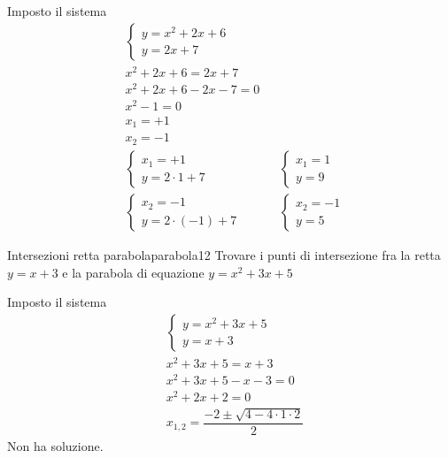 Imposto il sistema
\begin{align*}
&\begin{cases}
y=x^2+2x+6\\
y=2x+7
\end{cases}\\
&x^2+2x+6=2x+7\\
&x^2+2x+6-2x-7=0\\
&x^2-1=0\\
&x_1=+1\\
&x_2=-1\\
&\begin{cases}
x_1=+1\\
y=2\cdot 1+7
\end{cases}
&&\begin{cases}
x_1=1\\
y=9
\end{cases}\\
&\begin{cases}
x_2=-1\\
y=2\cdot(-1)+7
\end{cases}
&&\begin{cases}
x_2=-1\\
y=5
\end{cases}
\end{align*}
\begin{center}
	
	\label{fig:disegnoparabola11}
\end{center}
\begin{esempiot}{Intersezioni retta parabola}{parabola12}
	Trovare i punti di intersezione fra la retta $y=x+3$ e la parabola di equazione $y=x^2+3x+5$
\end{esempiot}
Imposto il sistema
\begin{align*}
&\begin{cases}
y=x^2+3x+5\\
y=x+3
\end{cases}\\
&x^2+3x+5=x+3\\
&x^2+3x+5-x-3=0\\
&x^2+2x+2=0\\
&x_{1,2}=\dfrac{-2\pm\sqrt{4-4\cdot 1\cdot 2}}{2}
\end{align*}
Non ha soluzione.
\begin{center}
	
	\label{fig:disegnoparabola12}
\end{center}
